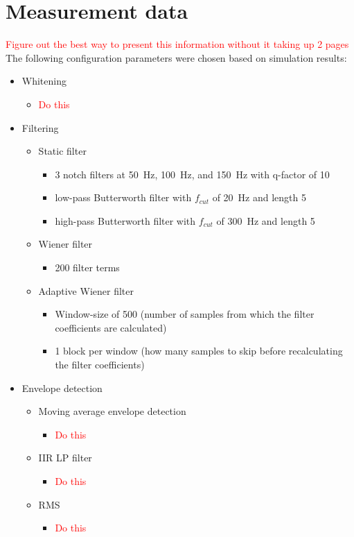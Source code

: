 \section{Measurement data}
\textcolor{red}{Figure out the best way to present this information without it taking up 2 pages}
The following configuration parameters were chosen based on simulation results:
\begin{itemize}
    \item Whitening
    \begin{itemize}
        \item \textcolor{red}{Do this}
    \end{itemize}
    \item Filtering
    \begin{itemize}
        \item Static filter 
        \begin{itemize}
            \item 3 notch filters at \SI{50}{\hertz}, \SI{100}{\hertz}, and \SI{150}{\hertz} with q-factor of 10
            \item low-pass Butterworth filter with $f_{cut}$ of \SI{20}{\hertz} and length 5
            \item high-pass Butterworth filter with $f_{cut}$ of \SI{300}{\hertz} and length 5
        \end{itemize}
        \item Wiener filter
        \begin{itemize}
            \item 200 filter terms
        \end{itemize}
        \item Adaptive Wiener filter
        \begin{itemize}
            \item Window-size of 500 (number of samples from which the filter coefficients are calculated)
            \item 1 block per window (how many samples to skip before recalculating the filter coefficients)
        \end{itemize}
    \end{itemize}
    \item Envelope detection
        \begin{itemize}
            \item Moving average envelope detection
        \begin{itemize}
            \item \textcolor{red}{Do this}
        \end{itemize}
        \item IIR LP filter
        \begin{itemize}
            \item \textcolor{red}{Do this}
        \end{itemize}
        \item RMS
        \begin{itemize}
            \item \textcolor{red}{Do this}
        \end{itemize}
    \end{itemize}
\end{itemize}


